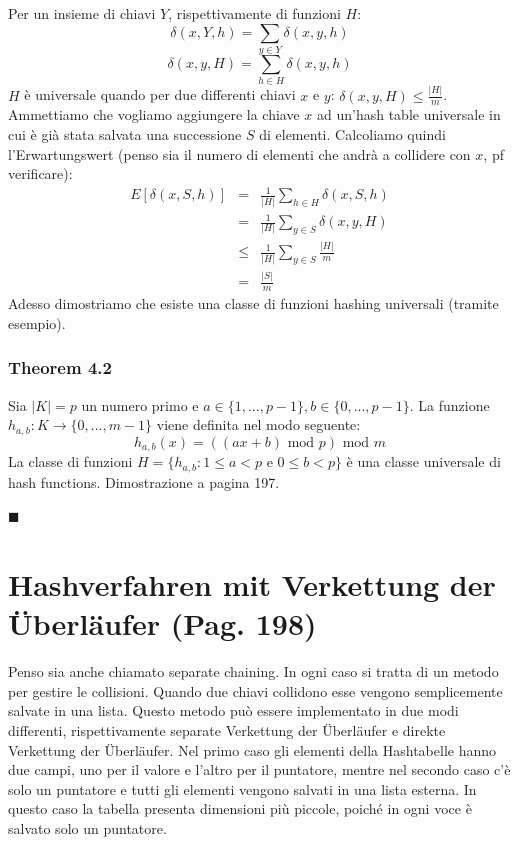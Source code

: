 \documentclass[a4paper]{book}
\newenvironment{mytheorem}[1]{\subsubsection*{Theorem #1}}{\begin{flushright}$\blacksquare$\end{flushright}}
\begin{document}
Per un insieme di chiavi $Y$, rispettivamente di funzioni $H$:
$$\delta (x,Y,h)= \sum_{y \in Y} \delta (x,y,h)$$
$$\delta (x,y,H)= \sum_{h \in H} \delta (x,y,h)$$
$H$ è universale quando per due differenti chiavi $x$ e $y$: $\delta (x,y,H) \leq \frac{|H|}{m}$.
Ammettiamo che vogliamo aggiungere la chiave $x$ ad un'hash table universale in cui è già stata salvata una successione $S$ di elementi. Calcoliamo quindi l'Erwartungswert (penso sia il numero di elementi che andrà a collidere con $x$, pf verificare):
\begin{eqnarray}
E[\delta (x,S,h)] &=& \frac{1}{|H|} \sum_{h \in H} \delta (x,S,h) \nonumber \\
&=& \frac{1}{|H|} \sum_{y \in S} \delta (x,y,H) \nonumber \\
&\leq & \frac{1}{|H|} \sum_{y \in S} \frac{|H|}{m} \nonumber \\
&=& \frac{|S|}{m}
\end{eqnarray}
Adesso dimostriamo che esiste una classe di funzioni hashing universali (tramite esempio).
\begin{mytheorem}{4.2}
Sia $|K|=p$ un numero primo e $a \in \{1, ..., p-1\},b \in \{0, ..., p-1\}$. La funzione $h_{a,b}: K \rightarrow \{0, ..., m-1\}$ viene definita nel modo seguente:
$$ h_{a,b}(x)=((ax+b) \mbox{ mod } p) \mbox{ mod } m$$
La classe di funzioni $H=\{h_{a,b} : 1\leq a < p \mbox{ e } 0\leq b <p\}$ è una classe universale di hash functions. Dimostrazione a pagina 197.
\end{mytheorem}
\section{Hashverfahren mit Verkettung der Überläufer (Pag. 198)}
Penso sia anche chiamato separate chaining. In ogni caso si tratta di un metodo per gestire le collisioni. Quando due chiavi collidono esse vengono semplicemente salvate in una lista. Questo metodo può essere implementato in due modi differenti, rispettivamente separate Verkettung der Überläufer e direkte Verkettung der Überläufer. Nel primo caso gli elementi della Hashtabelle hanno due campi, uno per il valore e l'altro per il puntatore, mentre nel secondo caso c'è solo un puntatore e tutti gli elementi vengono salvati in una lista esterna. In questo caso la tabella presenta dimensioni più piccole, poiché in ogni voce è salvato solo un puntatore.
\end{document}
